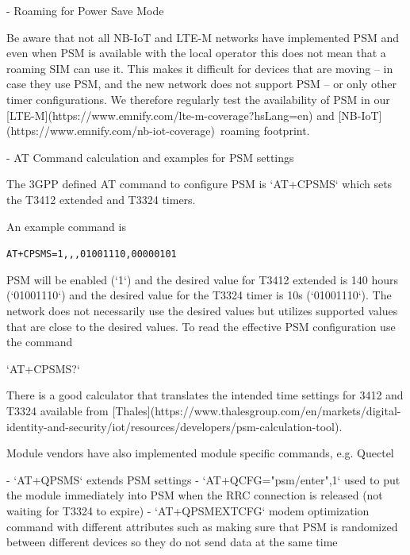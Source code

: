\documentclass[11pt, oneside]{article}   	%
\newcommand{\addspace}{\vspace{2mm}}
\begin{document}
\addspace
\begin{markdown}
- Roaming for Power Save Mode 
\end{markdown}
\addspace
\begin{markdown}

Be aware that not all NB-IoT and LTE-M networks have implemented PSM and even when PSM is available with the local operator this does not mean that a roaming SIM can use it.
This makes it difficult for devices that are moving -- in case they use PSM, and the new network does not support PSM -- or only other timer configurations.
We therefore regularly test the availability of PSM in our [LTE-M](https://www.emnify.com/lte-m-coverage?hsLang=en) and [NB-IoT](https://www.emnify.com/nb-iot-coverage) roaming footprint.

\end{markdown}
\addspace
\begin{markdown}
- AT Command calculation and examples for PSM settings 
\end{markdown}
\addspace
\begin{markdown} 

The 3GPP defined AT command to configure PSM is `AT+CPSMS` which sets the T3412 extended and T3324 timers. 

An example command is 

\end{markdown}

\texttt{AT+CPSMS=1,}\texttt{,}\texttt{,01001110,00000101}

\begin{markdown}

PSM will be enabled (`1`) and the desired value for T3412 extended is 140 hours (`01001110`) and the desired value for the T3324 timer is 10s (`01001110`).
The network does not necessarily use the desired values but utilizes supported values that are close to the desired values.
To read the effective PSM configuration use the command  

`AT+CPSMS?`

There is a good calculator that translates the intended time settings for 3412 and T3324 available from [Thales](https://www.thalesgroup.com/en/markets/digital-identity-and-security/iot/resources/developers/psm-calculation-tool). 

Module vendors have also implemented module specific commands, e.g. Quectel

\end{markdown}
\addspace
\begin{markdown}
- `AT+QPSMS` extends PSM settings
- `AT+QCFG="psm/enter",1` used to put the module immediately into PSM when the RRC connection is released (not waiting for T3324 to expire)
- `AT+QPSMEXTCFG` modem optimization command with different attributes such as making sure that PSM is randomized between different devices so they do not send data at the same time
\end{markdown}
\end{document}
